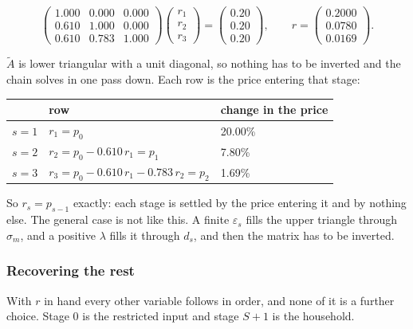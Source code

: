 \documentclass[11pt,a4paper]{article}
\begin{document}
\begin{equation}
\begin{pmatrix}
1.000 & 0.000 & 0.000 \\
0.610 & 1.000 & 0.000 \\
0.610 & 0.783 & 1.000
\end{pmatrix}
\begin{pmatrix} r_1 \\ r_2 \\ r_3 \end{pmatrix}
=
\begin{pmatrix} 0.20 \\ 0.20 \\ 0.20 \end{pmatrix} ,
\qquad
r = \begin{pmatrix} 0.2000 \\ 0.0780 \\ 0.0169 \end{pmatrix} .
\end{equation}

$\tilde A$ is lower triangular with a unit diagonal, so nothing has to be inverted and the chain solves in one pass down. Each row is the price entering that stage:

\begin{center}
\small
\begin{tabular}{lll}
\toprule
& \textbf{row} & \textbf{change in the price} \\
\midrule
$s=1$ & $r_1 = p_0$ & 20.00\% \\
$s=2$ & $r_2 = p_0 - 0.610\, r_1 = p_1$ & \phantom{0}7.80\% \\
$s=3$ & $r_3 = p_0 - 0.610\, r_1 - 0.783\, r_2 = p_2$ & \phantom{0}1.69\% \\
\bottomrule
\end{tabular}
\end{center}

So $r_s = p_{s-1}$ exactly: each stage is settled by the price entering it and by nothing else. The general case is not like this. A finite $\varepsilon_s$ fills the upper triangle through $\hat\sigma_m$, and a positive $\lambda$ fills it through $d_s$, and then the matrix has to be inverted.

\subsubsection*{Recovering the rest}

With $r$ in hand every other variable follows in order, and none of it is a further choice. Stage 0 is the restricted input and stage $S+1$ is the household.
\end{document}
